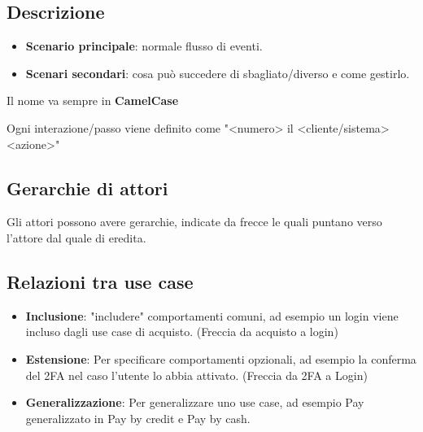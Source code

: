 \subsection{Descrizione}
\begin{itemize}
    \item \textbf{Scenario principale}: normale flusso di eventi.
    \item \textbf{Scenari secondari}: cosa può succedere di sbagliato/diverso e come gestirlo.
\end{itemize}

\noindent Il nome va sempre in \textbf{CamelCase}

\noindent Ogni interazione/passo viene definito come "<numero> il <cliente/sistema> <azione>"

\subsection{Gerarchie di attori}
Gli attori possono avere gerarchie, indicate da frecce le quali puntano verso l'attore dal quale di eredita.

\subsection{Relazioni tra use case}
\begin{itemize}
    \item \textbf{Inclusione}: "includere" comportamenti comuni, ad esempio un login viene incluso dagli use case di acquisto. (Freccia da acquisto a login)
    \item \textbf{Estensione}: Per specificare comportamenti opzionali, ad esempio la conferma del 2FA nel caso l'utente lo abbia attivato. (Freccia da 2FA a Login)
    \item \textbf{Generalizzazione}: Per generalizzare uno use case, ad esempio Pay generalizzato in Pay by credit e Pay by cash.
\end{itemize}